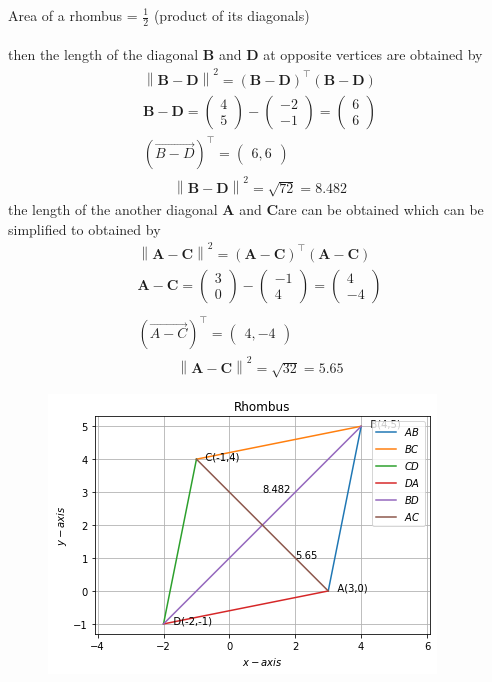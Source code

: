 \documentclass[12pt]{article}
\providecommand{\brak}[1]{\ensuremath{\left(#1\right)}}
\providecommand{\norm}[1]{\left\lVert#1\right\rVert}
\newcommand{\myvec}[1]{\ensuremath{\begin{pmatrix}#1\end{pmatrix}}}
\let\vec\mathbf
\begin{document}
\begin{enumerate}
Area of a rhombus  = $\frac{1}{2}$ (product of its diagonals)\\\\
then the length of the diagonal $\vec{B}$ and $\vec{D}$ at opposite vertices are obtained by
\begin{align}
 \norm{\vec{B}-\vec{D}}^2  = \brak{\vec{B}-\vec{D}}^{\top} \brak{\vec{B}-\vec{D}}\\
 \vec{B-D}= \myvec{4 \\ 5} - \myvec{-2 \\-1}= \myvec{6\\6}\\
(\Vec{B-D})^{\top}=\myvec{6,6}
\end{align}
\begin{align}
     \norm{\vec{B}-\vec{D}}^2  = \sqrt{72} = 8.482
\end{align}
the length of the another diagonal $\vec{A}$ and $\vec{C}$are can be obtained 
which can be simplified to obtained by
\begin{align}
 \norm{\vec{A}-\vec{C}}^2  = \brak{\vec{A}-\vec{C}}^{\top} \brak{\vec{A}-\vec{C}}\\
  \vec{A-C}= \myvec{3 \\ 0} - \myvec{-1 \\4}= \myvec{4\\-4}\\\\
(\Vec{A-C})^{\top}=\myvec{4,-4}
\end{align}
\begin{align}
     \norm{\vec{A}-\vec{C}}^2  = \sqrt{32} = 5.65
\end{align}
\begin{figure}[!h]
 \begin{center}
  \includegraphics[width=\columnwidth]{./figs/fig.png}
 \end{center}
\caption{}
\label{fig:Fig1}
\end{figure}
\end{enumerate}
\end{document}
